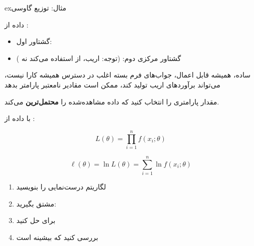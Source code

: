 \begin{PSbox}[unbreakable]{ex}{مثال: توزیع گاوسی}

داده از :

\begin{itemize}
\tightlist
\item
  گشتاور اول: 
\item
  گشتاور مرکزی دوم:  (توجه: اریب، از  استفاده می‌کند نه )
\end{itemize}

\end{PSbox}


\lr{\PSyes{}} ساده، همیشه قابل اعمال، جواب‌های فرم بسته اغلب در دسترس\PSbr{}\PSno{} همیشه کارا نیست، می‌تواند برآوردهای اریب تولید کند، ممکن است مقادیر نامعتبر پارامتر بدهد



مقدار پارامتری را انتخاب کنید که داده مشاهده‌شده را \textbf{محتمل‌ترین} می‌کند.


با داده  از :

\[L(\theta) = \prod_{i=1}^n f(x_i; \theta)\]


\[\ell(\theta) = \ln L(\theta) = \sum_{i=1}^n \ln f(x_i; \theta)\]


\begin{enumerate}
\def\labelenumi{\arabic{enumi}.}
\tightlist
\item
  لگاریتم درست‌نمایی \lr{\ensuremath{\ell}(\ensuremath{\theta})} را بنویسید
\item
  مشتق بگیرید: 
\item
  برای  حل کنید
\item
  بررسی کنید که بیشینه است 
\end{enumerate}

